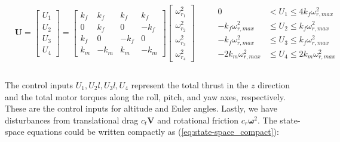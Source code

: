 \documentclass[journal,11pt,onecolumn,draftclsnofoot,]{IEEEtran}
\begin{document}
\begin{equation}
\label{eq:controls}
\begin{split}
\begin{matrix}
\begin{matrix}
\boldsymbol{U}=
\begin{bmatrix}
U_1\\ U_2\\ U_3\\ U_4
\end{bmatrix}
=
\begin{bmatrix}
k_f & k_f & k_f & k_f\\ 
0 & k_f & 0 & -k_f\\ 
k_f & 0 & -k_f & 0\\ 
k_m & -k_m & k_m & -k_m
\end{bmatrix}
\begin{bmatrix}
\omega _{r_1}^2\\ 
\omega _{r_2}^2\\ 
\omega _{r_3}^2\\ 
\omega _{r_4}^2
\end{bmatrix}\\
\end{matrix}
& \;\;\;\;
\begin{matrix}
0 &< U_1 \le 4 k_f \omega_{r,max}^2 \\
-k_f \omega_{r,max}^2 &\le U_2 \le k_f \omega_{r,max}^2 \\
-k_f \omega_{r,max}^2 &\le U_3 \le k_f \omega_{r,max}^2 \\
-2 k_m \omega_{r,max}^2 &\le U_4 \le 2 k_m \omega_{r,max}^2 \\
\end{matrix}
\end{matrix}
\end{split}
\end{equation}

The control inputs $U_1, U_2l, U_3l, U_4$ represent the total thrust in the $z$ direction and the total motor torques along the roll, pitch, and yaw axes, respectively. These are the control inputs for altitude and Euler angles.
Lastly, we have disturbances from translational drag $c_t \boldsymbol{V}$ and rotational friction $c_r \boldsymbol{\omega}^2$. The state-space equations could be written compactly as (\ref{eq:state-space_compact}):
\end{document}
